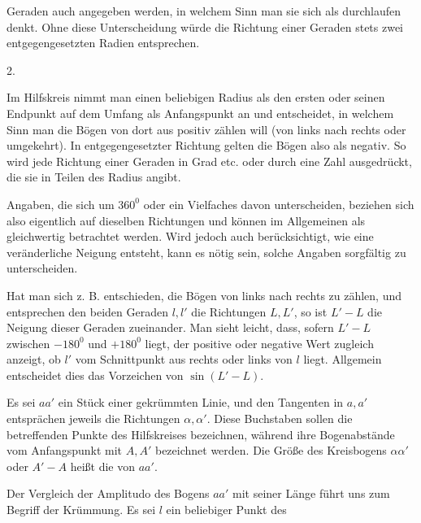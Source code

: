 %
Geraden auch angegeben werden, in welchem Sinn man sie sich als durchlaufen denkt. Ohne diese Unterscheidung würde die Richtung einer Geraden stets zwei entgegengesetzten Radien entsprechen.

\begin{center}2.\end{center}
\noindent\hspace*{1.2em}Im Hilfskreis nimmt man einen beliebigen Radius als den ersten oder seinen Endpunkt auf dem Umfang als Anfangspunkt an und entscheidet, in welchem Sinn man die Bögen von dort aus positiv zählen will (von links nach rechts oder umgekehrt). In entgegengesetzter Richtung gelten die Bögen also als negativ. So wird jede Richtung einer Geraden in Grad etc. oder durch eine Zahl ausgedrückt, die sie in Teilen des Radius angibt.

Angaben, die sich um $360^{0}$ oder ein Vielfaches davon unterscheiden, beziehen sich also eigentlich auf dieselben Richtungen und können im Allgemeinen als gleichwertig betrachtet werden. Wird jedoch auch berücksichtigt, wie eine veränderliche Neigung entsteht, kann es nötig sein, solche Angaben sorgfältig zu unterscheiden.

Hat man sich z. B. entschieden, die Bögen von links nach rechts zu zählen, und entsprechen den beiden Geraden $l,l'$ die Richtungen $L,L'$, so ist $L'-L$ die Neigung dieser Geraden zueinander. Man sieht leicht, dass, sofern $L'-L$ zwischen $-180^{0}$ und $+180^{0}$ liegt, der positive oder negative Wert zugleich anzeigt, ob $l'$ vom Schnittpunkt aus rechts oder links von $l$ liegt. Allgemein entscheidet dies das Vorzeichen von $\sin(L'-L)$.

Es sei $aa'$ ein Stück einer gekrümmten Linie, und den Tangenten in $a,a'$ entsprächen jeweils die Richtungen $\alpha,\alpha'$. Diese Buchstaben sollen die betreffenden Punkte des Hilfskreises bezeichnen, während ihre Bogenabstände vom Anfangspunkt mit $A,A'$ bezeichnet werden. Die Größe des Kreisbogens $\alpha\alpha'$ oder $A'-A$ heißt die  von $aa'$.

Der Vergleich der Amplitudo des Bogens $aa'$ mit seiner Länge führt uns zum Begriff der Krümmung. Es sei $l$ ein beliebiger Punkt des\space%
